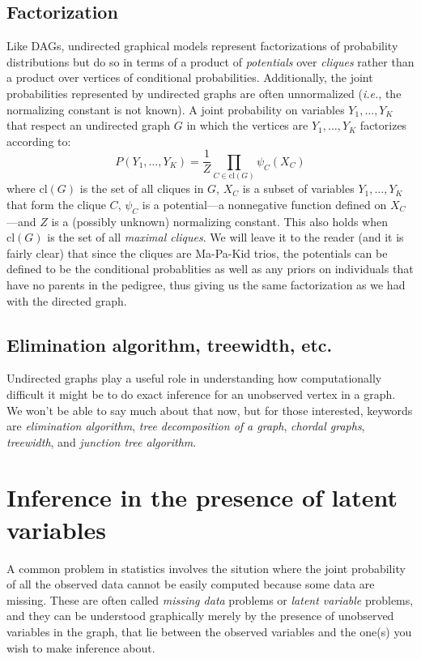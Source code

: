 \documentclass[11pt]{article}
\newcommand{\ie}{{\em i.e.},\xspace }
\begin{document}
\subsection{Factorization}
Like DAGs, undirected graphical models represent factorizations of probability distributions
but do so in terms of a product of {\em potentials} over {\em cliques} rather than a product
over vertices of conditional probabilities.  Additionally, the joint probabilities represented
by undirected graphs are often unnormalized (\ie the normalizing constant is not known).
A joint probability on variables $Y_1, \ldots, Y_K$ that respect an undirected graph $G$
in which the vertices are $Y_1, \ldots, Y_K$ factorizes according to:
\[
P(Y_1, \ldots, Y_K) = \frac{1}{Z}\prod_{C\in \mathrm{cl}(G)}\psi_C(X_C)
\]
where $\mathrm{cl}(G)$ is the set of all cliques in $G$, $X_C$ is a subset of variables 
$Y_1, \ldots, Y_K$ that form the clique $C$, $\psi_C$ is a potential---a
nonnegative function defined on $X_C$---and $Z$ is a (possibly unknown) normalizing
constant. This also holds when $\mathrm{cl}(G)$ is the set
of all {\em maximal cliques}.  We will leave it to the reader (and it is fairly
clear) that since the cliques are Ma-Pa-Kid trios, the potentials can be defined to be
the conditional probablities as well as any priors on individuals that have no
parents in the pedigree, thus giving us the same factorization as we had with the
directed graph.

\subsection{Elimination algorithm, treewidth, etc.}
Undirected graphs play a useful role in understanding how computationally difficult
it might be to do exact inference for an unobserved vertex in a graph.  We won't 
be able to say much about that now, but for those interested, keywords are
{\em elimination algorithm}, {\em tree decomposition of a graph}, {\em chordal graphs},
{\em treewidth}, and {\em junction tree algorithm}.  

\section{Inference in the presence of latent variables}
A common problem in statistics involves the sitution where the joint probability of all the
observed data cannot be easily computed because some data are missing.  These are often
called {\em missing data} problems or {\em latent variable} problems, and they can 
be understood graphically merely by the presence of unobserved variables in the graph, that
lie between the observed variables and the one(s) you wish to make inference about.
\end{document}
